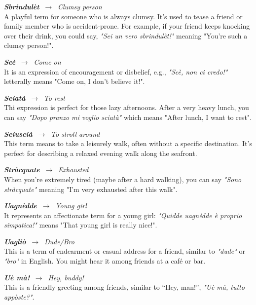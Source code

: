 \documentclass[
	openany, %
	parskip=full, %
	12pt, %
	a4paper, %
]{conferencebooklet} %
\begin{document}
\begin{adjustwidth}{10pt}{20pt}
\begin{multicols}{2}
    \RaggedRight
    \textbf{\textit{Sbrindulèt}} $\ \rightarrow \ $ \textit{Clumsy person} \\
    \justifying
    A playful term for someone who is always clumsy. It’s used to tease a friend or family member who is accident-prone. For example, if your friend keeps knocking over their drink, you could say, \textit{"Sei un vero sbrindulèt!"} meaning "You're such a clumsy person!".

    \RaggedRight
    \textbf{\textit{Scè}} $\ \rightarrow \ $ \textit{Come on} \\
    \justifying
    It is an expression of encouragement or disbelief, e.g., \textit{"Scè, non ci credo!"} letterally means "Come on, I don’t believe it!".

    \RaggedRight
    \textbf{\textit{Sciatà}} $\ \rightarrow \ $ \textit{To rest} \\
    \justifying
    Thi expression is perfect for those lazy afternoons. After a very heavy lunch, you can say \textit{"Dopo pranzo mi voglio sciatà"} which means "After lunch, I want to rest".

    \RaggedRight
    \textbf{\textit{Sciuscià}} $\ \rightarrow \ $ \textit{To stroll around} \\
    \justifying
    This term means to take a leisurely walk, often without a specific destination. It's perfect for describing a relaxed evening walk along the seafront.

    \RaggedRight
    \textbf{\textit{Stràcquate}} $\ \rightarrow \ $ \textit{Exhausted} \\
    \justifying
    When you're extremely tired (maybe after a hard walking), you can say \textit{"Sono stràcquate"} meaning "I’m very exhausted after this walk".
    
    \RaggedRight
    \textbf{\textit{Uagnèdde}} $\ \rightarrow \ $ \textit{Young girl} \\
    \justifying
    It represents an affectionate term for a young girl: \textit{"Quidde uagnèdde è proprio simpatica!"} means "That young girl is really nice!".

    \RaggedRight
    \textbf{\textit{Uagliò}} $\ \rightarrow \ $ \textit{Dude/Bro} \\
    \justifying
    This is a term of endearment or casual address for a friend, similar to \textit{"dude"} or \textit{"bro"} in English. You might hear it among friends at a café or bar.

    \RaggedRight
    \textbf{\textit{Uè mà!}} $\ \rightarrow \ $ \textit{Hey, buddy!} \\
    \justifying
    This is a friendly greeting among friends, similar to “Hey, man!”, \textit{"Uè mà, tutto appòste?"}.
    

\end{multicols}
\end{adjustwidth}
\end{document}
